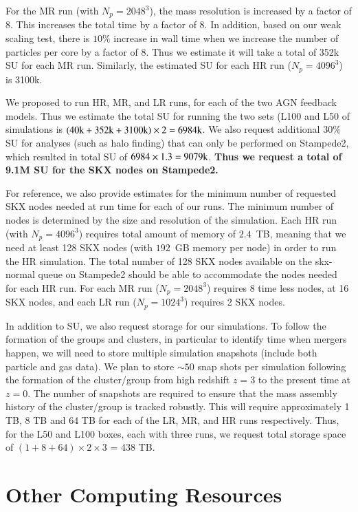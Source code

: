 \documentclass[letterpaper,11pt]{article}
\begin{document}
For the MR run (with $N_p = 2048^3$), the mass resolution is increased by a factor of 8. This increases the total time by a factor of 8. In addition, based on our weak scaling test, there is $10\%$ increase in wall time when we increase the number of particles per core by a factor of 8. Thus we estimate it will take a total of 352k SU for each MR run. Similarly, the estimated SU for each HR run ($N_p = 4096^3$) is 3100k.

We proposed to run HR, MR, and LR runs, for each of the two AGN feedback models. Thus we estimate the total SU for running the two sets (L100 and L50 of simulations is ${\rm (40k+352k+3100k)\times  2 = 6984k}$. We also request additional $30\%$ SU for analyses (such as halo finding) that can only be performed on Stampede2, which resulted in total SU of ${\rm 6984\times 1.3 = 9079k}$. {\bf Thus we request a total of 9.1M SU for the SKX nodes on Stampede2.} 

For reference, we also provide estimates for the minimum number of requested SKX nodes needed at run time for each of our runs. The minimum number of nodes is determined by the size and resolution of the simulation. Each HR run (with $N_p = 4096^3$) requires total amount of memory of $2.4$~TB, meaning that we need at least 128 SKX nodes (with $192$~GB memory per node) in order to run the HR simulation. The total number of 128 SKX nodes available on the skx-normal queue on Stampede2 should be able to accommodate the nodes needed for each HR run. For each MR run ($N_p = 2048^3$) requires 8 time less nodes, at 16 SKX nodes, and each LR run ($N_p = 1024^3$) requires 2 SKX nodes. 

In addition to SU, we also request storage for our simulations. To follow the formation of the groups and clusters, in particular to identify time when mergers happen, we will need to store multiple simulation snapshots (include both particle and gas data). We plan to store $\sim 50$ snap shots per simulation following the formation of the cluster/group from high redshift $z=3$ to the present time at $z=0$. The number of snapshots are required to ensure that the mass assembly history of the cluster/group is tracked robustly. This will require approximately 1 TB, 8 TB and 64 TB for each of the LR, MR, and HR runs respectively. Thus, for the L50 and L100 boxes, each with three runs, we request total storage space of $(1+8+64)\times2\times3$ = 438 TB. 

\section{Other Computing Resources}
\end{document}
